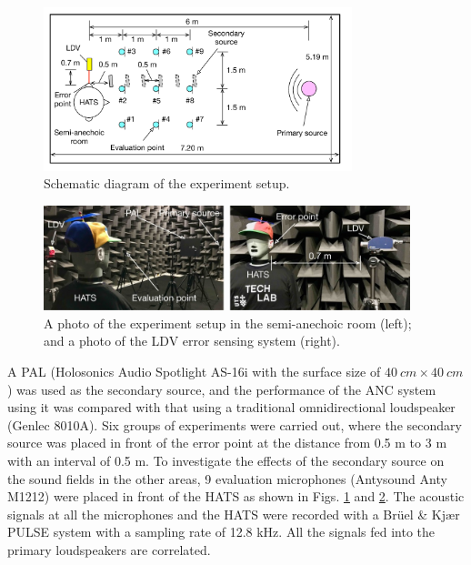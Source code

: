 \begin{figure}[!htb]
    \centering
    \includegraphics[width = 0.8\textwidth]{fig/ExperimentLayout.pdf}
    \caption{ Schematic diagram of the experiment setup.}
    \label{fig:ancpal_sketch}
\end{figure}

\begin{figure}[!htb]
    \centering
    \includegraphics[width = 0.95\textwidth]{fig/ExperimentPhoto_resize.jpg}
    \caption{A photo of the experiment setup in the semi-anechoic room (left); and a photo of the LDV error sensing system (right).}
    \label{fig:ancpal_photo}
\end{figure}

A PAL (Holosonics Audio Spotlight AS-16i with the surface size of $\SI{40}{cm} \times\SI{ 40}{ cm}$) was used as the secondary source, and the performance of the ANC system using it was compared with that using a traditional omnidirectional loudspeaker (Genlec 8010A). 
Six groups of experiments were carried out, where the secondary source was placed in front of the error point at the distance from 0.5 m to 3 m with an interval of 0.5 m. 
To investigate the effects of the secondary source on the sound fields in the other areas, 9 evaluation microphones (Antysound Anty M1212) were placed in front of the HATS as shown in Figs. \ref{fig:ancpal_sketch} and \ref{fig:ancpal_photo}. 
The acoustic signals at all the microphones and the HATS were recorded with a Brüel \& Kjær PULSE system with a sampling rate of 12.8 kHz. 
All the signals fed into the primary loudspeakers are correlated. 


